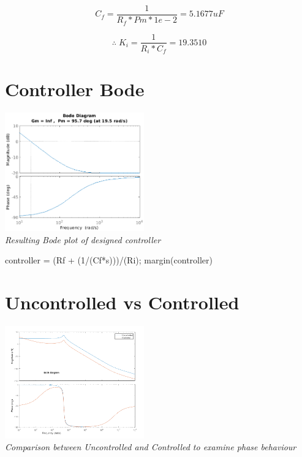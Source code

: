 \documentclass[11pt]{article}
\begin{document}
\begin{preview}
    $$C_f = \frac{1}{R_f * Pm * 1e-2} = 5.1677uF$$

    $$\therefore \; K_i = \frac{1}{R_i * C_f} = 19.3510$$

    \section{Controller Bode}
    \begin{center}
        \includegraphics[width=0.45\textwidth]{img/controller.eps}\\
        \textit{Resulting Bode plot of designed controller}
    \end{center}
    
    \begin{matlabcode}
        controller = (Rf + (1/(Cf*s)))/(Ri);
        margin(controller)
    \end{matlabcode}

    \section{Uncontrolled vs Controlled}
    \begin{center}
        \includegraphics[width=0.45\textwidth]{img/comp.png}\\
        \textit{Comparison between Uncontrolled and Controlled to examine phase behaviour}
    \end{center}
    

\end{preview}
\end{document}
